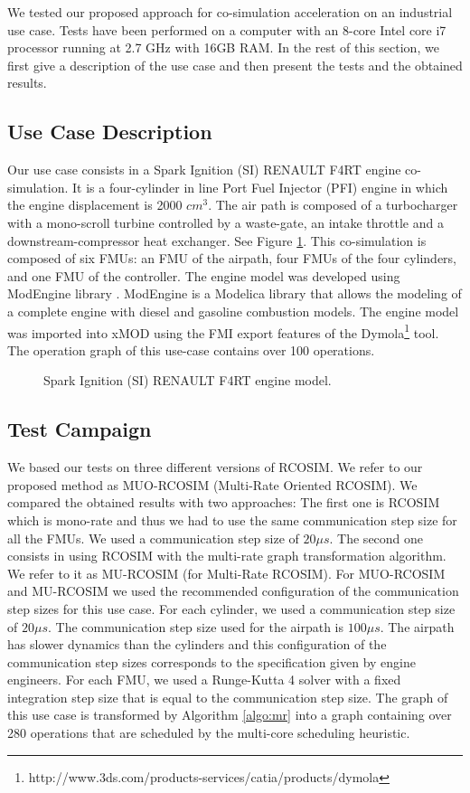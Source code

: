 We tested our proposed approach for co-simulation acceleration on an industrial use case. Tests have been performed on a computer with an 8-core Intel core i7 processor running at 2.7 GHz with 16GB RAM. In the rest of this section, we first give a description of the use case and then present the tests and the obtained results.

\subsection{Use Case Description}

Our use case consists in a Spark Ignition (SI) RENAULT F4RT engine co-simulation. It is a four-cylinder in line Port Fuel Injector (PFI) engine in which the engine displacement is 2000 $cm^3$. The air path is composed of a turbocharger with a mono-scroll turbine controlled by a waste-gate, an intake throttle and a downstream-compressor heat exchanger. See Figure \ref{fig:use_case}. This co-simulation is composed of six FMUs: an FMU of the airpath, four FMUs of the four cylinders, and one FMU of the controller.
The engine model was developed using ModEngine library \cite{benjelloun:2011}. ModEngine is a Modelica library that allows the modeling of a complete engine with diesel and gasoline combustion models. The engine model was imported into xMOD using the FMI export features of the Dymola\footnote{http://www.3ds.com/products-services/catia/products/dymola} tool. The operation graph of this use-case contains over 100 operations.

\begin{figure}[phbt]
\centering

\caption{Spark Ignition (SI) RENAULT F4RT engine model.}
\label{fig:use_case}
\end{figure}

\subsection{Test Campaign}

We based our tests on three different versions of RCOSIM. We refer to our proposed method as MUO-RCOSIM (Multi-Rate Oriented RCOSIM). We compared the obtained results with two approaches: The first one is RCOSIM which is mono-rate and thus we had to use the same communication step size for all the FMUs. We used a communication step size of $20 {\mu}s$. The second one consists in using RCOSIM with the multi-rate graph transformation algorithm. We refer to it as MU-RCOSIM (for Multi-Rate RCOSIM). For MUO-RCOSIM and MU-RCOSIM we used the recommended configuration of the communication step sizes for this use case. For each cylinder, we used a communication step size of $20 {\mu}s$. The communication step size used for the airpath is $100 {\mu}s$. The airpath has slower dynamics than the cylinders and this configuration of the communication step sizes corresponds to the specification given by engine engineers. For each FMU, we used a Runge-Kutta 4 solver with a fixed integration step size that is equal to the communication step size. The graph of this use case is transformed by Algorithm \ref{algo:mr} into a graph containing over 280 operations that are scheduled by the multi-core scheduling heuristic.      

